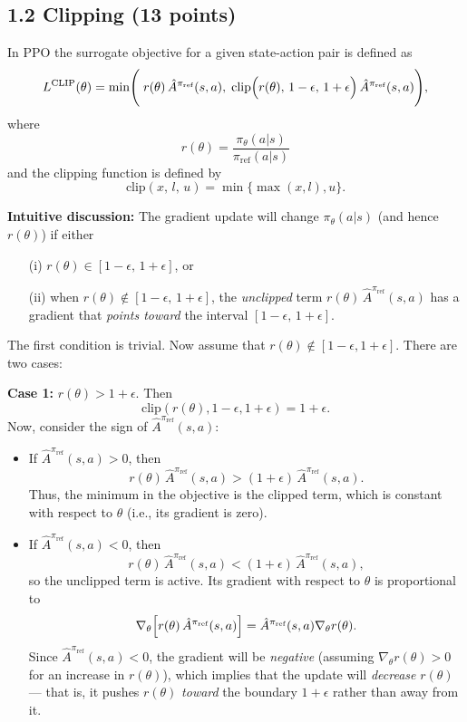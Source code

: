 \vspace{2mm}

\subsection*{1.2 Clipping (13 points)}

In PPO the surrogate objective for a given state-action pair is defined as
\[
  L^{\text{CLIP}}(\theta) = \min\Biggl( \; r(\theta)\,\hat{A}^{\pi_{\text{ref}}}(s,a), \;
  \text{clip}\Bigl( r(\theta),\, 1-\epsilon,\, 1+\epsilon \Bigr) \, \hat{A}^{\pi_{\text{ref}}}(s,a) \Biggr),
\]
where
\[
  r(\theta) = \frac{\pi_{\theta}(a|s)}{\pi_{\text{ref}}(a|s)}
\]
and the clipping function is defined by
\[
  \text{clip}(x,\, l,\, u) = \min\{\max(x,l),u\}.
\]

\textbf{Intuitive discussion:} The gradient update will change $\pi_{\theta}(a|s)$ (and hence $r(\theta)$) if either 
\begin{enumerate}
  \item[(i)] $r(\theta) \in [1-\epsilon,\,1+\epsilon]$, or 
  \item[(ii)] when $r(\theta) \notin [1-\epsilon,\,1+\epsilon]$, the \emph{unclipped} term $r(\theta)\,\hat{A}^{\pi_{\text{ref}}}(s,a)$ has a gradient that \emph{points toward} the interval $[1-\epsilon,\,1+\epsilon]$.
\end{enumerate}
The first condition is trivial. Now assume that $r(\theta)\notin[1-\epsilon,1+\epsilon]$. There are two cases:

\textbf{Case 1:} $r(\theta)>1+\epsilon$. Then
\[
  \text{clip}(r(\theta),1-\epsilon,1+\epsilon) = 1+\epsilon.
\]
Now, consider the sign of $\hat{A}^{\pi_{\text{ref}}}(s,a)$:
\begin{itemize}
  \item If $\hat{A}^{\pi_{\text{ref}}}(s,a)>0$, then 
  \[
    r(\theta)\,\hat{A}^{\pi_{\text{ref}}}(s,a) > (1+\epsilon)\,\hat{A}^{\pi_{\text{ref}}}(s,a).
  \]
  Thus, the minimum in the objective is the clipped term, which is constant with respect to $\theta$ (i.e., its gradient is zero).
  
  \item If $\hat{A}^{\pi_{\text{ref}}}(s,a)<0$, then 
  \[
    r(\theta)\,\hat{A}^{\pi_{\text{ref}}}(s,a) < (1+\epsilon)\,\hat{A}^{\pi_{\text{ref}}}(s,a),
  \]
  so the unclipped term is active. Its gradient with respect to $\theta$ is proportional to 
  \[
    \nabla_\theta \Bigl[ r(\theta)\,\hat{A}^{\pi_{\text{ref}}}(s,a) \Bigr] = \hat{A}^{\pi_{\text{ref}}}(s,a) \nabla_\theta r(\theta).
  \]
  Since $\hat{A}^{\pi_{\text{ref}}}(s,a) < 0$, the gradient will be \emph{negative} (assuming $\nabla_\theta r(\theta)>0$ for an increase in $r(\theta)$), which implies that the update will \emph{decrease} $r(\theta)$ --- that is, it pushes $r(\theta)$ \emph{toward} the boundary $1+\epsilon$ rather than away from it.
\end{itemize}

